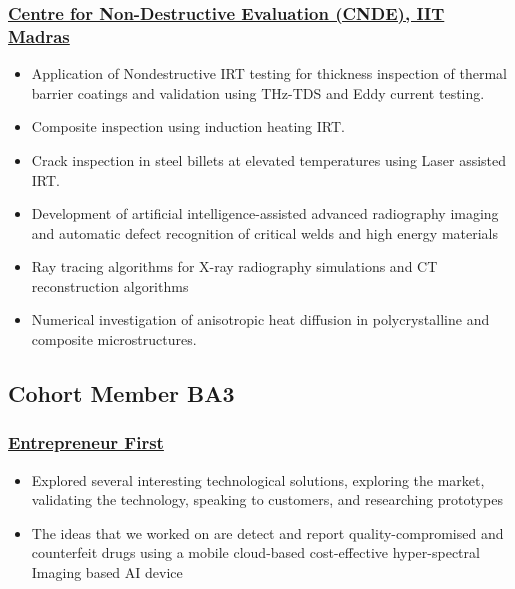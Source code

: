 \documentclass{my_cv}%
\begin{document}
\subsubsection{\href{https://www.cnde.in/}{Centre for Non-Destructive Evaluation (CNDE), IIT Madras}}
\begin{itemize}[leftmargin=0.15in]
\setlength\itemsep{-0.1em}
\color{mygray}
\item Application of Nondestructive IRT testing for thickness inspection of thermal barrier coatings and validation using THz-TDS and Eddy current testing.
\item Composite inspection using induction heating IRT.
\item Crack inspection in steel billets at elevated temperatures using Laser assisted IRT.
\item Development of artificial intelligence-assisted advanced radiography imaging and automatic defect recognition of critical welds and high energy materials
\item Ray tracing algorithms for X-ray radiography simulations and CT reconstruction algorithms
\item Numerical investigation of anisotropic heat diffusion in polycrystalline and composite microstructures.
\end{itemize}%
{\color{mygray1} \hdashrule[0.1ex]{18.8cm}{0.2mm}{1mm}}
\subsection{Cohort Member BA3}
\subsubsection{\href{https://www.joinef.com/}{Entrepreneur First}}
\begin{itemize}[leftmargin=0.15in]
\setlength\itemsep{-0.1em}
\color{mygray}
\item Explored several interesting technological solutions, exploring the market, validating the technology, speaking to customers, and researching prototypes
\item The ideas that we worked on are detect and report quality-compromised and counterfeit drugs using a mobile cloud-based cost-effective hyper-spectral Imaging based AI device
\end{itemize}
{\color{mygray1} \hdashrule[0.1ex]{18.8cm}{0.2mm}{1mm}}
\end{document}
